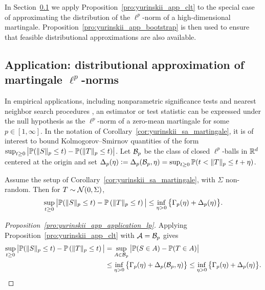 In Section~\ref{sec:yurinskii_app_lp} we apply
Proposition~\ref{pro:yurinskii_app_clt} to the special case
of approximating the distribution of the $\ell^p$-norm of a high-dimensional
martingale. Proposition~\ref{pro:yurinskii_app_bootstrap} is then used to
ensure that
feasible distributional approximations are also available.

\subsection{Application: distributional approximation of martingale
\texorpdfstring{$\ell^p$}{lp}-norms}
\label{sec:yurinskii_app_lp}

In empirical applications,
including nonparametric significance tests
\citep{lopes2020bootstrapping}
and nearest neighbor search procedures
\citep{biau2015high},
an estimator or test statistic
can be expressed under the null hypothesis
as the $\ell^p$-norm of a zero-mean
martingale for some $p \in [1, \infty]$.
In the notation of Corollary~\ref{cor:yurinskii_sa_martingale},
it is of interest to bound Kolmogorov--Smirnov
quantities of the form
$\sup_{t \geq 0} \big| \P( \|S\|_p \leq t) - \P( \|T\|_p \leq t) \big|$.
Let $\cB_p$ be the class of closed $\ell^p$-balls in $\R^d$ centered at the
origin and set
$\Delta_p(\eta) \vcentcolon= \Delta_p(\cB_p, \eta)
= \sup_{t \geq 0} \P( t < \|T\|_p \leq t + \eta )$.

\begin{proposition}
  \label{pro:yurinskii_app_application_lp}

  Assume the setup of Corollary~\ref{cor:yurinskii_sa_martingale},
  with $\Sigma$ non-random. Then for $T \sim \cN(0, \Sigma)$,
  \begin{equation}%
    \label{eq:yurinskii_app_application_lp}
    \sup_{t \geq 0}
    \big| \P( \|S\|_p \leq t )
    - \P\left( \|T\|_p \leq t \right) \big|
    \leq \inf_{\eta>0}
    \big\{\Gamma_p(\eta) + \Delta_p(\eta) \big\}.
  \end{equation}
\end{proposition}

\begin{proof}[Proposition~\ref{pro:yurinskii_app_application_lp}]

  Applying Proposition~\ref{pro:yurinskii_app_clt}
  with $\cA=\cB_p$ gives
  \begin{align*}
    \sup_{t \geq 0}
    \big| \P( \|S\|_p \leq t )
    - \P\left( \|T\|_p \leq t \right) \big|
    &= \sup_{A\in \cB_p}
    \big|\P(S\in A) -\P(T\in A)\big| \\
    &\leq
    \inf_{\eta>0}
    \big\{\Gamma_p(\eta) + \Delta_p(\cB_p, \eta) \big\}
    \leq
    \inf_{\eta>0}
    \big\{\Gamma_p(\eta) + \Delta_p(\eta) \big\}.
  \end{align*}
\end{proof}


